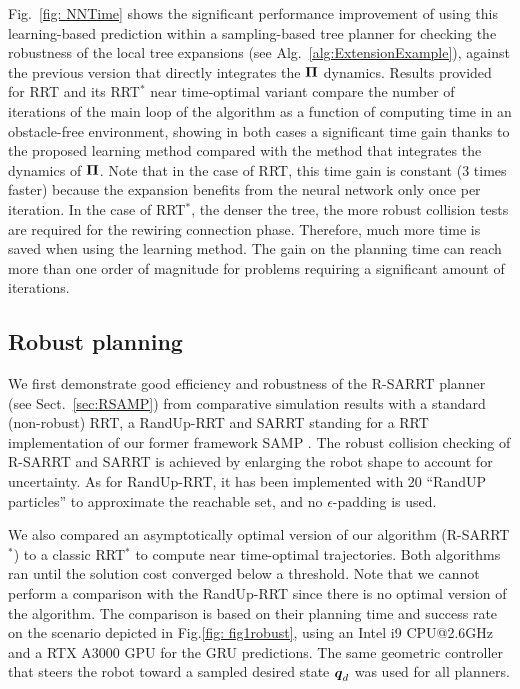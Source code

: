 
Fig.~\ref{fig: NNTime} shows the significant performance improvement of using this learning-based prediction within a sampling-based tree planner for checking the robustness of the local tree expansions (see Alg.~\ref{alg:ExtensionExample}), against the previous version \cite{cSAMP} that directly integrates the $\boldsymbol{\Pi}$ dynamics.  
Results provided for RRT and its RRT$^*$ near time-optimal variant compare the number of iterations of the main loop of the algorithm as a function of computing time in an obstacle-free environment, showing in both cases a significant time gain thanks to the proposed learning method compared with the method that integrates the dynamics of $\boldsymbol{\Pi}$.
Note that in the case of RRT, this time gain is constant ($3$ times faster)  because the expansion benefits from the neural network only once per iteration.
In the case of RRT$^*$, the denser the tree, the more robust collision tests are required for the rewiring connection phase. 
Therefore, much more time is saved when using the learning method. 
The gain on the planning time can reach more than one order of magnitude for problems requiring a significant amount of iterations.

\subsection{Robust planning} \label{sec:RobustPlanSimu}

We first demonstrate good efficiency and robustness of the R-SARRT planner (see Sect.~\ref{sec:RSAMP}) from comparative simulation results with a standard (non-robust) RRT, a RandUp-RRT \cite{cRandUpRRT} and SARRT standing for a RRT implementation of our former framework SAMP \cite{cSAMP}.
The robust collision checking of R-SARRT and SARRT is achieved by enlarging the robot shape to account for uncertainty. 
As for RandUp-RRT, it has been implemented with 20 ``RandUP particles'' to approximate the reachable set, and no $\epsilon$-padding is used.

We also compared an asymptotically optimal version of our algorithm (R-SARRT$^*$) to 
a classic RRT$^*$ to compute near time-optimal trajectories. 
Both algorithms ran until the solution cost converged below a threshold.
Note that we cannot perform a comparison with the RandUp-RRT since there is no optimal version of the algorithm. 
The comparison is based on their planning time and success rate on the scenario depicted in Fig.\ref{fig: fig1robust}, using an Intel i9 CPU@2.6GHz and a RTX A3000 GPU for the GRU predictions.
The same geometric controller that steers the robot toward a sampled desired state $\boldsymbol{q}_d$ was used for all planners.

